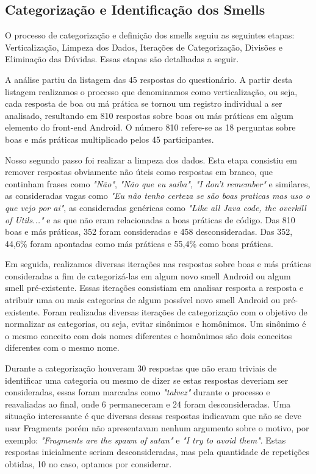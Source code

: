 \subsection{Categoriza\c{c}\~ao e Identifica\c{c}\~ao dos Smells}
\label{sub:smells-definition}

O processo de categoriza\c{c}\~ao e defini\c{c}\~ao dos smells seguiu as seguintes etapas: Verticaliza\c{c}\~ao, Limpeza dos Dados, Itera\c{c}\~oes de Categoriza\c{c}\~ao, Divis\~oes e Elimina\c{c}\~ao das D\'uvidas. Essas etapas s\~ao detalhadas a seguir.

A an\'alise partiu da listagem das 45 respostas do question\'ario. A partir desta listagem realizamos o processo que denominamos como verticaliza\c{c}\~ao, ou seja, cada resposta de boa ou m\'a pr\'atica se tornou um registro individual a ser analisado, resultando em 810 respostas sobre boas ou m\'as pr\'aticas em algum elemento do front-end Android. O n\'umero 810 refere-se as 18 perguntas sobre boas e m\'as pr\'aticas multiplicado pelos 45 participantes.

Nosso segundo passo foi realizar a limpeza dos dados. Esta etapa consistiu em remover respostas obviamente n\~ao \'uteis como respostas em branco, que continham frases como \textit{"N\~ao"}, \textit{"N\~ao que eu saiba"}, \textit{"I don't remember"} e similares, as consideradas vagas como \textit{"Eu n\~ao tenho certeza se s\~ao boas praticas mas uso o que vejo por ai"}, as consideradas gen\'ericas como \textit{"Like all Java code, the overkill of Utils..."} e as que n\~ao eram relacionadas a boas pr\'aticas de c\'odigo. Das 810 boas e m\'as pr\'aticas, 352 foram consideradas e 458 desconsideradas. Das 352, 44,6\% foram apontadas como m\'as pr\'aticas e 55,4\% como boas pr\'aticas. 

Em seguida, realizamos diversas itera\c{c}\~oes nas respostas sobre boas e m\'as pr\'aticas consideradas a fim de categoriz\'a-las em algum novo smell Android ou algum smell pr\'e-existente. Essas itera\c{c}\~oes consistiam em analisar resposta a resposta e atribuir uma ou mais categorias de algum poss\'ivel novo smell Android ou pr\'e-existente. Foram realizadas diversas itera\c{c}\~oes de categoriza\c{c}\~ao com o objetivo de normalizar as categorias, ou seja, evitar sin\^onimos e hom\^onimos. Um sin\^onimo \'e o mesmo conceito com dois nomes diferentes e hom\^onimos s\~ao dois conceitos diferentes com o mesmo nome. 

Durante a categoriza\c{c}\~ao houveram 30 respostas que n\~ao eram triviais de identificar uma categoria ou mesmo de dizer se estas respostas deveriam ser consideradas, essas foram marcadas como \textit{"talvez"} durante o processo e reavaliadas ao final, onde 6 permaneceram e 24 foram desconsideradas. Uma situa\c{c}\~ao interessante \'e que diversas dessas respostas indicavam que n\~ao se deve usar Fragments por\'em n\~ao apresentavam nenhum argumento sobre o motivo, por exemplo: \textit{"Fragments are the spawn of satan"} e \textit{"I try to avoid them"}. Estas respostas inicialmente seriam desconsideradas, mas pela quantidade de repeti\c{c}\~oes obtidas, 10 no caso, optamos por considerar.

